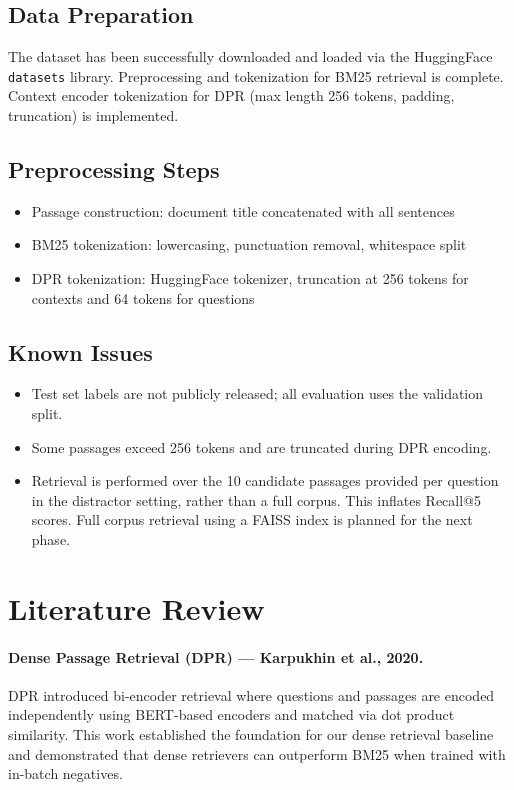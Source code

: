 \documentclass[12pt,a4paper]{article}
\begin{document}
\subsection*{Data Preparation}

The dataset has been successfully downloaded and loaded via the HuggingFace
\texttt{datasets} library. Preprocessing and tokenization for BM25 retrieval is complete.
Context encoder tokenization for DPR (max length 256 tokens, padding, truncation) is
implemented.

\subsection*{Preprocessing Steps}

\begin{itemize}[noitemsep]
    \item Passage construction: document title concatenated with all sentences
    \item BM25 tokenization: lowercasing, punctuation removal, whitespace split
    \item DPR tokenization: HuggingFace tokenizer, truncation at 256 tokens for contexts
          and 64 tokens for questions
\end{itemize}

\subsection*{Known Issues}

\begin{itemize}[noitemsep]
    \item Test set labels are not publicly released; all evaluation uses the validation split.
    \item Some passages exceed 256 tokens and are truncated during DPR encoding.
    \item Retrieval is performed over the 10 candidate passages provided per question
          in the distractor setting, rather than a full corpus. This inflates Recall@5
          scores. Full corpus retrieval using a FAISS index is planned for the next phase.
\end{itemize}

\section{Literature Review}

\paragraph{Dense Passage Retrieval (DPR) — Karpukhin et al., 2020.}
DPR introduced bi-encoder retrieval where questions and passages are encoded
independently using BERT-based encoders and matched via dot product similarity.
This work established the foundation for our dense retrieval baseline and demonstrated
that dense retrievers can outperform BM25 when trained with in-batch negatives.
\end{document}
